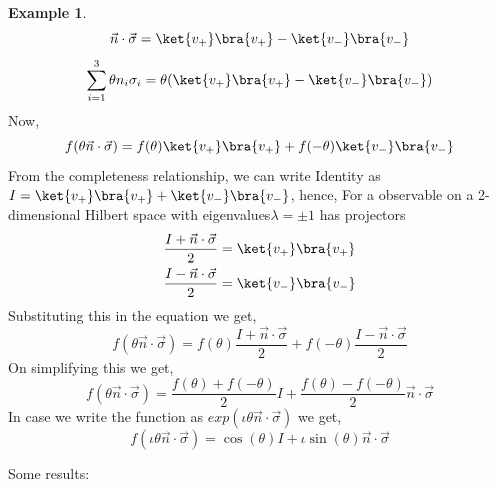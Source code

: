 \documentclass[12pt, oneside]{book}
\theoremstyle{definition}
\theoremstyle{definition}
\newtheorem{example}{Example}[section]
\theoremstyle{remark}
\begin{document}
\begin{example}
    \[
    \vec{n}\cdot\vec{\sigma}=\ket{v_+}\bra{v_+}-\ket{v_-}\bra{v_-}
    \]
    \[
    \sum_{i=1}^3 \theta n_i\sigma_i=\theta (\ket{v_+}\bra{v_+} - \ket{v_-}\bra{v_-})
    \]
    Now,
    \[
    f(\theta \vec{n}\cdot\vec{\sigma})=f(\theta)\ket{v_+}\bra{v_+}+f(-\theta)\ket{v_-}\bra{v_-}
    \]
    From the completeness relationship, we can write Identity as $I=\ket{v_+}\bra{v_+}+\ket{v_-}\bra{v_-}$, hence, For a observable on a 2-dimensional Hilbert space with eigenvalues$\lambda=\pm 1$ has projectors
    \begin{align*}
    \frac{I+\vec{n}\cdot\vec{\sigma}}{2}&=\ket{v_+}\bra{v_+}\\
    \frac{I-\vec{n}\cdot\vec{\sigma}}{2}&=\ket{v_-}\bra{v_-}
    \end{align*}
    Substituting this in the equation we get,
    \[
    f(\theta\vec{n}\cdot\vec{\sigma})=f(\theta)\frac{I+\vec{n}\cdot\vec{\sigma}}{2}+f(-\theta)\frac{I-\vec{n}\cdot\vec{\sigma}}{2}
    \]
    On simplifying this we get,
    \[
    f(\theta\vec{n}\cdot\vec{\sigma})=\frac{f(\theta)+f(-\theta)}{2}I+\frac{f(\theta)-f(-\theta)}{2}\vec{n}\cdot\vec{\sigma}
    \]
    In case we write the function as $exp(\iota \theta\vec{n}\cdot\vec{\sigma})$ we get,
    \[
    f(\iota\theta\vec{n}\cdot\vec{\sigma})=\cos(\theta)I+\iota\sin(\theta) \vec{n}\cdot\vec{\sigma}
    \]
    \end{example}
Some results:
\end{document}
